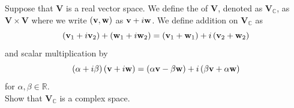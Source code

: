 \begin{exercise}
  Suppose that \( \mathbf{V} \) is a real vector space. We define the  of \( \mathbf{V} \), denoted as \( \mathbf{V}_{\mathbb{C}} \), as \( \mathbf{V} \times  \mathbf{V} \) where we write \( \left( \vb{v}, \vb{w} \right) \) as \( \vb{v} + i \vb{w} \). We define addition on \( \mathbf{V}_{\mathbb{C}} \) as 
  \[ \left( \vb{v}_{1} + i \vb{v}_{2} \right) + \left( \vb{w}_{1} + i \vb{w}_{2} \right) = \left( \vb{v}_{1} + \vb{w}_{1} \right) + i \left( \vb{v}_{2} + \vb{w}_{2} \right) \]
  and scalar multiplication by 
  \[ \left( \alpha + i \beta \right) \left( \vb{v} + i \vb{w} \right) = \left( \alpha \vb{v} - \beta \vb{w} \right) + i \left( \beta \vb{v} + \alpha \vb{w} \right) \]
  for \( \alpha, \beta \in \mathbb{R} \). \\
  Show that \( \mathbf{V}_{\mathbb{C}}\) is a complex space. 
\end{exercise}

